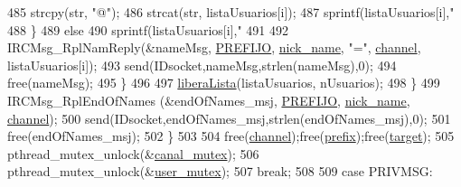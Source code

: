 \begin{DoxyCode}
{{{{{{{485                                                         strcpy(str, \textcolor{stringliteral}{"@"});
486                                                         strcat(str, listaUsuarios[i]);
487                                                         sprintf(listaUsuarios[i],\textcolor{stringliteral}{"%
488                                                 \}
489                                                 \textcolor{keywordflow}{else}
490                                                         sprintf(listaUsuarios[i],\textcolor{stringliteral}{"%
491 
492                                                 IRCMsg\_RplNamReply(&nameMsg,
      \hyperlink{_g-2361-06-_p1-_server_8h_a78c658ff923693099f7b621e7c351129}{PREFIJO}, \hyperlink{_g-2361-06-_p1-_server_8c_aabbf66718cda228b924a4a9441eadf62}{nick\_name}, \textcolor{stringliteral}{"="}, \hyperlink{_g-2361-06-_p1-_server_8c_a842ca2f026578e5c479c095ff3335969}{channel}, listaUsuarios[i]);
493                                                 send(IDsocket,nameMsg,strlen(nameMsg),0);
494                                                 free(nameMsg); 
495                                         \}                                       
496 
497                                         \hyperlink{_g-2361-06-_p1-_functions_8h_a5fa63429b3483f20a469c23625c96820}{liberaLista}(listaUsuarios, nUsuarios);
498                                 \}
499                                 IRCMsg\_RplEndOfNames (&endOfNames\_msj, \hyperlink{_g-2361-06-_p1-_server_8h_a78c658ff923693099f7b621e7c351129}{PREFIJO}, 
      \hyperlink{_g-2361-06-_p1-_server_8c_aabbf66718cda228b924a4a9441eadf62}{nick\_name}, \hyperlink{_g-2361-06-_p1-_server_8c_a842ca2f026578e5c479c095ff3335969}{channel});
500                                 send(IDsocket,endOfNames\_msj,strlen(endOfNames\_msj),0);
501                                 free(endOfNames\_msj);
502                         \}
503 
504                         free(\hyperlink{_g-2361-06-_p1-_server_8c_a842ca2f026578e5c479c095ff3335969}{channel});free(\hyperlink{_g-2361-06-_p1-_server_8c_ad2849cf781a4db22cc1b31eaaee50a4f}{prefix});free(\hyperlink{_g-2361-06-_p1-_server_8c_a23b26cdb3a71f525caf03b57f68d47fa}{target});
505                         pthread\_mutex\_unlock(&\hyperlink{_g-2361-06-_p1-_server_8c_ab86a544a49de18195048bac54dd3ac3e}{canal\_mutex});
506                         pthread\_mutex\_unlock(&\hyperlink{_g-2361-06-_p1-_server_8c_a5dedd07a1144d2ab70b74a8e64b6a7c0}{user\_mutex});
507                         \textcolor{keywordflow}{break};
508 
509                 \textcolor{keywordflow}{case} PRIVMSG:
}}}}}}}}}
\end{DoxyCode}
